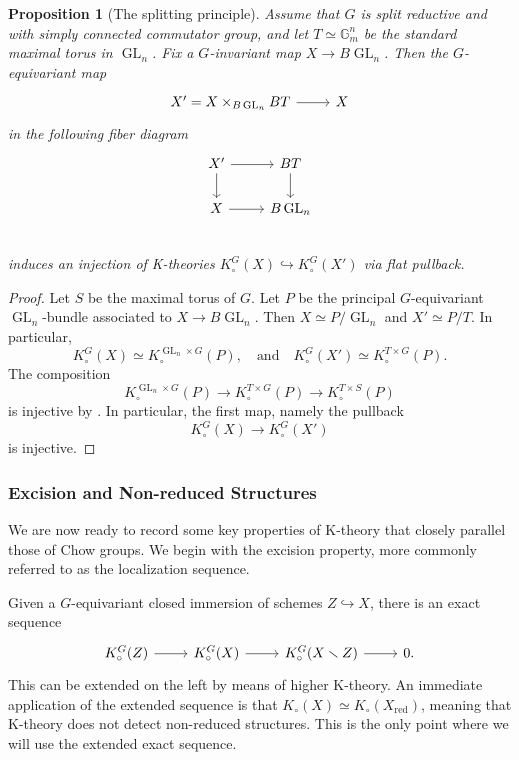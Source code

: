 \documentclass[12pt]{amsart}
\newcommand\Gm{\mathbb{G}_m}
\newcommand{\GL}{\operatorname{GL}}
\newcommand{\Kgroup}{K_{\circ}}
\newtheorem{Prop}[theorem]{Proposition}
\theoremstyle{definition}
\begin{document}
\begin{Prop}[The splitting principle] \label{prop:classical-splitting-principle}
Assume that $G$ is split reductive and with simply connected commutator group, and let $T\simeq\Gm^n$ be the standard maximal torus in $\GL_n$. Fix a $G$-invariant map $X \to B \GL_n$. Then the $G$-equivariant map 
\[
\begin{tikzcd}
    X'=X \times_{B\GL_n} BT \arrow[r] & X
\end{tikzcd}
\]
in the following fiber diagram $$\begin{tikzcd}
X' \arrow[r] \arrow[d] & BT \arrow[d]\\
X \arrow[r] & B\GL_n  \\
\end{tikzcd}$$
induces an injection of K-theories $\Kgroup^G(X) \hookrightarrow \Kgroup^G(X')$ via flat pullback.
\end{Prop}
\begin{proof}
Let $S$ be the maximal torus of $G$. Let $P$ be the principal $G$-equivariant $\GL_n$-bundle associated to $X\rightarrow B\GL_n$. Then $X\simeq P/\GL_n$ and $X'\simeq P/T$. In particular,
\[
\Kgroup^G(X)\simeq \Kgroup^{\GL_n\times G}(P),\quad\text{and}\quad \Kgroup^G(X')\simeq \Kgroup^{T\times G}(P).
\]
The composition
\[
\Kgroup^{\GL_n \times G}(P) \longrightarrow \Kgroup^{T \times G}(P) \longrightarrow \Kgroup^{T \times S}(P)
\]
is injective by \cite[Proposition 31]{Merkurjev-equivariantKtheory}. In particular, the first map, namely the pullback
\[
\Kgroup^{G}(X) \longrightarrow \Kgroup^{G}(X')
\]
is injective.
\end{proof}



\subsubsection{Excision and Non-reduced Structures} \label{sec:excision}

We are now ready to record some key properties of K-theory that closely parallel those of Chow groups. We begin with the excision property, more commonly referred to as the localization sequence.

Given a $G$-equivariant closed immersion of schemes $Z\hookrightarrow X$, there is an exact sequence
\[
\begin{tikzcd}
    \Kgroup^G(Z)\arrow[r] & \Kgroup^G(X)\arrow[r] & \Kgroup^G(X\smallsetminus Z)\arrow[r] & 0.
\end{tikzcd}
\]
This can be extended on the left by means of higher K-theory. An immediate application of the extended sequence is that $\Kgroup(X)\simeq\Kgroup(X_{\mathrm{red}})$, meaning that K-theory does not detect non-reduced structures. This is the only point where we will use the extended exact sequence.
\end{document}
